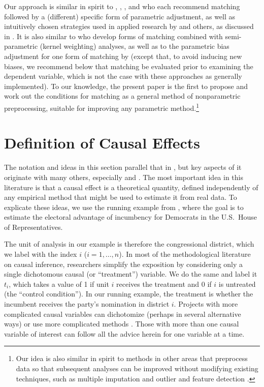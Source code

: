 \documentclass[11pt,titlepage]{article}
\begin{document}
Our approach is similar in spirit to \citet{ImaDyk03},
\citet{RosRub84a}, \citet{Rubin79}, and \citet{RubTho00} who each
recommend matching followed by a (different) specific form of
parametric adjustment, as well as intuitively chosen strategies used
in applied research by \citet{Rosenbaum86} and others, as discussed in
\citet{GlaLevMye03}.  It is also similar to \citet{HecIchTod98} who
develop forms of matching combined with semi-parametric (kernel
weighting) analyses, as well as to the parametric bias adjustment for
one form of matching by \citep{AbaImb04} (except that, to avoid
inducing new biases, we recommend below that matching be evaluated
prior to examining the dependent variable, which is not the case with
these approaches as generally implemented).  To our knowledge, the
present paper is the first to propose and work out the conditions for
matching as a general method of nonparametric preprocessing, suitable
for improving any parametric method.\footnote{Our idea is also similar
  in spirit to methods in other areas that preprocess data so that
  subsequent analyses can be improved without modifying existing
  techniques, such as multiple imputation \citep{Rubin87,KinHonJos01}
  and outlier and feature detection \citep[][Ch.8]{Bishop95}.}

\section{Definition of Causal Effects}

The notation and ideas in this section parallel that in
\citet[][Section 3.1.1]{KinKeoVer94}, but key aspects of it originate
with many others, especially \citet{Rubin74} and \citet{Holland86}.
The most important idea in this literature is that a causal effect is
a theoretical quantity, defined independently of any empirical method
that might be used to estimate it from real data.  To explicate these
ideas, we use the running example from \citet[][Section
3.1.1]{KinKeoVer94}, where the goal is to estimate the electoral
advantage of incumbency for Democrats in the U.S.\ House of
Representatives.

The unit of analysis in our example is therefore the congressional
district, which we label with the index $i$ ($i=1,\dots,n$).  In most
of the methodological literature on causal inference, researchers
simplify the exposition by considering only a single dichotomous
causal (or ``treatment'') variable.  We do the same and label it
$t_i$, which takes a value of 1 if unit $i$ receives the treatment and
0 if $i$ is untreated (the ``control condition'').  In our running
example, the treatment is whether the incumbent receives the party's
nomination in district $i$.  Projects with more complicated causal
variables can dichotomize (perhaps in several alternative ways) or use
more complicated methods \citep{ImaDyk03}.  Those with more than one
causal variable of interest can follow all the advice herein for one
variable at a time.
\end{document}
